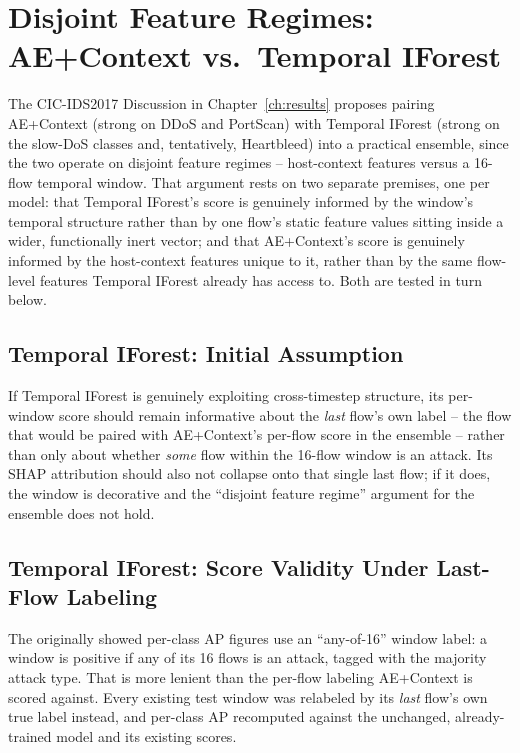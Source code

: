 \section{Disjoint Feature Regimes: AE+Context vs.\ Temporal IForest}
\label{sec:explain-disjoint-regime}

The CIC-IDS2017 Discussion in Chapter~\ref{ch:results} proposes pairing AE+Context (strong on DDoS and PortScan) with Temporal IForest (strong on the slow-DoS classes and, tentatively, Heartbleed) into a practical ensemble, since the two operate on disjoint feature regimes -- host-context features versus a 16-flow temporal window. That argument rests on two separate premises, one per model: that Temporal IForest's score is genuinely informed by the window's temporal structure rather than by one flow's static feature values sitting inside a wider, functionally inert vector; and that AE+Context's score is genuinely informed by the host-context features unique to it, rather than by the same flow-level features Temporal IForest already has access to. Both are tested in turn below.

\subsection{Temporal IForest: Initial Assumption}

If Temporal IForest is genuinely exploiting cross-timestep structure, its per-window score should remain informative about the \emph{last} flow's own label -- the flow that would be paired with AE+Context's per-flow score in the ensemble -- rather than only about whether \emph{some} flow within the 16-flow window is an attack. Its SHAP attribution should also not collapse onto that single last flow; if it does, the window is decorative and the ``disjoint feature regime'' argument for the ensemble does not hold.

\subsection{Temporal IForest: Score Validity Under Last-Flow Labeling}

The originally showed per-class AP figures use an ``any-of-16'' window label: a window is positive if any of its 16 flows is an attack, tagged with the majority attack type. That is more lenient than the per-flow labeling AE+Context is scored against. Every existing test window was relabeled by its \emph{last} flow's own true label instead, and per-class AP recomputed against the unchanged, already-trained model and its existing scores.

